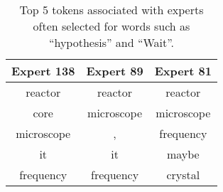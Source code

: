 \begin{table}[tb]
    \centering
    \renewcommand{\arraystretch}{.8} %
    \begin{tabular}{ccc}
         Expert 138 & Expert 89 & Expert 81 \\
        \midrule
       reactor    & reactor    & reactor     \\
         core       & microscope & microscope \\
        microscope & ,          & frequency      \\
       it        & it         & maybe      \\
       frequency  & frequency  & crystal       \\
        \bottomrule
    \end{tabular}
    \caption{Top 5 tokens associated with experts often selected for words such as ``hypothesis'' and ``Wait''.} 
    \vspace{-1em}
    \label{tab:expert_top_tokens}
\end{table}
